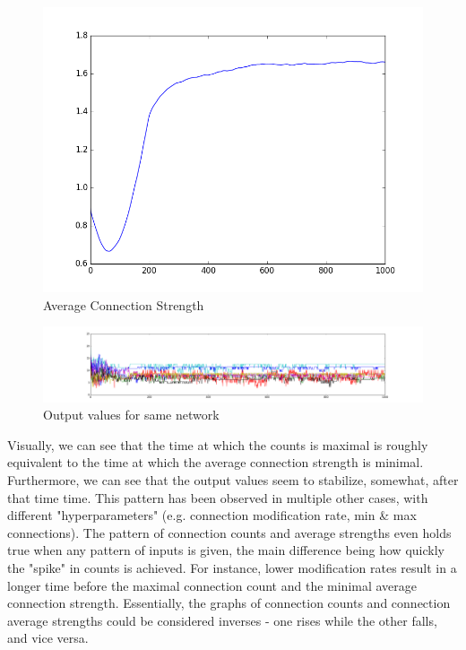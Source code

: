 \documentclass[12pt]{article}
\begin{document}
\begin{figure}[H]
    \includegraphics[width=\linewidth]{../visualizations/strengths_lowrate1000frames.png}
    \caption{Average Connection Strength}
\end{figure}

\begin{figure}[H]
    \includegraphics[width=\linewidth]{../visualizations/lowrate1000frames.png}
    \caption{Output values for same network}
\end{figure}

Visually, we can see that the time at which the counts is maximal is roughly equivalent to the time at which the average connection strength is minimal.  Furthermore, we can see that the output values seem to stabilize, somewhat, after that time time.  This pattern has been observed in multiple other cases, with different "hyperparameters" (e.g. connection modification rate, min \& max connections).  The pattern of connection counts and average strengths even holds true when any pattern of inputs is given, the main difference being how quickly the "spike" in counts is achieved.  For instance, lower modification rates result in a longer time before the maximal connection count and the minimal average connection strength.  Essentially, the graphs of connection counts and connection average strengths could be considered inverses - one rises while the other falls, and vice versa.
\end{document}

